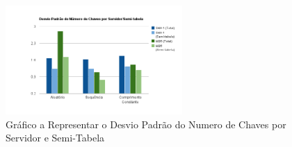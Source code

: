 \documentclass[times, 10pt,twocolumn]{article}
\begin{document}

\begin{figure}[h]
\centering
\includegraphics[width=0.6\textwidth]{graficoChavesServidor}
 \caption{Gráfico a Representar o Desvio Padrão do Numero de Chaves por Servidor e Semi-Tabela}
\end{figure}




\nocite{ex1,ex2}


\end{document}
